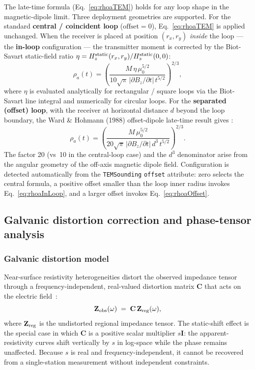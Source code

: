 \documentclass[review,12pt]{elsarticle}
\begin{document}
The late-time formula (Eq.~\ref{eq:rhoaTEM}) holds for any loop shape in
the magnetic-dipole limit.  Three deployment geometries are supported.
For the standard \textbf{central / coincident loop} ($\text{offset}=0$),
Eq.~\eqref{eq:rhoaTEM} is applied unchanged.
When the receiver is placed at position $(r_x, r_y)$ \emph{inside} the
loop — the \textbf{in-loop} configuration — the transmitter moment is
corrected by the Biot-Savart static-field ratio
$\eta = H_z^{\rm static}(r_x, r_y) / H_z^{\rm static}(0, 0)$:
\begin{equation}
  \rho_a(t) = \left(
      \frac{M\,\eta\,\mu_0^{5/2}}
            {10\sqrt{\pi}\,|\partial B_z/\partial t|\,t^{5/2}}
  \right)^{2/3},
  \label{eq:rhoaInLoop}
\end{equation}
where $\eta$ is evaluated analytically for rectangular / square loops
via the Biot-Savart line integral and numerically for circular loops.
For the \textbf{separated (offset) loop}, with the receiver at
horizontal distance $d$ beyond the loop boundary, the
Ward \& Hohmann (1988) offset-dipole late-time result gives
\citep{WardHohmann1988,NabighianMacnae1991}:
\begin{equation}
  \rho_a(t) = \left(
      \frac{M\,\mu_0^{5/2}}
            {20\sqrt{\pi}\,|\partial B_z/\partial t|\,d^3\,t^{5/2}}
  \right)^{2/3}.
  \label{eq:rhoaOffset}
\end{equation}
The factor 20 (vs~10 in the central-loop case) and the $d^3$ denominator
arise from the angular geometry of the off-axis magnetic dipole field.
Configuration is detected automatically from the \texttt{TEMSounding}
\texttt{offset} attribute: zero selects the central formula, a positive
offset smaller than the loop inner radius invokes Eq.~\eqref{eq:rhoaInLoop},
and a larger offset invokes Eq.~\eqref{eq:rhoaOffset}.

\subsection{Galvanic distortion correction and phase-tensor analysis}
\label{sec:staticshift}

\subsubsection{Galvanic distortion model}

Near-surface resistivity heterogeneities distort the observed impedance
tensor through a frequency-independent, real-valued distortion matrix
$\mathbf{C}$ that acts on the electric field~\citep{Berdichevskyetal1998}:
\begin{equation}
  \mathbf{Z}_{\rm obs}(\omega) \;=\; \mathbf{C}\,\mathbf{Z}_{\rm reg}(\omega),
  \label{eq:distortion}
\end{equation}
where $\mathbf{Z}_{\rm reg}$ is the undistorted regional impedance tensor.
The static-shift effect is the special case in which $\mathbf{C}$ is a
positive scalar multiplier $s\mathbf{I}$: the apparent-resistivity curves
shift vertically by $s$ in log-space while the phase remains unaffected.
Because $s$ is real and frequency-independent, it cannot be recovered from
a single-station measurement without independent constraints.
\end{document}
